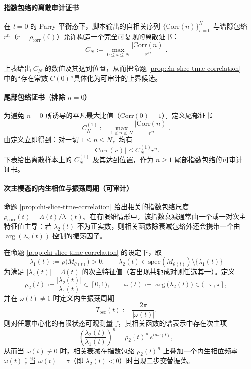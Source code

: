 \paragraph{指数包络的离散审计证书}
在 $t=0$ 的 Parry 平衡态下，脚本输出的自相关序列 $\{\mathrm{Corr}(n)\}_{n=0}^N$ 与谱隙包络 $r^n$（$r=\rho_{\mathrm{corr}}(0)$）允许构造一个完全可复现的离散证书：
\[
C_N:=\max_{0\le n\le N}\frac{|\mathrm{Corr}(n)|}{r^n}.
\]

上表给出 $C_N$ 的数值及其达到位置，从而把命题 \ref{prop:chi-slice-time-correlation} 中的“存在常数 $C(0)$”具体化为可审计的上界候选。

\paragraph{尾部包络证书（排除 $n=0$）}
为避免 $n=0$ 所诱导的平凡最大比值（$\mathrm{Corr}(0)=1$），定义尾部证书
\[
C_N^{(1)}:=\max_{1\le n\le N}\frac{|\mathrm{Corr}(n)|}{r^n}.
\]
由定义立即得到：对一切 $1\le n\le N$，均有
\[
|\mathrm{Corr}(n)|\le C_N^{(1)} r^n.
\]
下表给出离散样本上的 $C_N^{(1)}$ 及其达到位置，作为 $n\ge 1$ 尾部指数包络的可审计证书。


\paragraph{次主模态的内生相位与振荡周期（可审计）}
命题 \ref{prop:chi-slice-time-correlation} 给出相关的指数包络尺度 $\rho_{\mathrm{corr}}(t)=\Lambda(t)/\lambda_1(t)$。在有限维情形中，该指数衰减通常由一个或一对次主特征值主导：若 $\lambda_2(t)$ 不为正实数，则相关函数除衰减包络外还会携带一个由 $\arg(\lambda_2(t))$ 控制的振荡因子。

\begin{remark}[次主相位与内生振荡周期]
\label{prop:chi-slice-subleading-phase}
在命题 \ref{prop:chi-slice-time-correlation} 的设定下，取
\[
\lambda_1(t):=\rho\bigl(M_{\theta(t)}\bigr)>0,
\qquad
\lambda_2(t)\in\mathrm{spec}(M_{\theta(t)})\setminus\{\lambda_1(t)\}
\]
为满足 $|\lambda_2(t)|=\Lambda(t)$ 的次主特征值（若出现共轭成对则任选其一）。定义
\[
\rho_2(t):=\frac{|\lambda_2(t)|}{\lambda_1(t)}\in[0,1),
\qquad
\omega(t):=\arg\bigl(\lambda_2(t)\bigr)\in(-\pi,\pi],
\]
并在 $\omega(t)\ne 0$ 时定义内生振荡周期
\[
T_{\mathrm{osc}}(t):=\frac{2\pi}{|\omega(t)|}.
\]
则对任意中心化的有限状态可观测量 $f$，其相关函数的谱表示中存在次主项
\[
\left(\frac{\lambda_2(t)}{\lambda_1(t)}\right)^n
=\rho_2(t)^n\,e^{i n\omega(t)},
\]
从而当 $\omega(t)\ne 0$ 时，相关衰减在指数包络 $\rho_2(t)^n$ 上叠加一个内生相位频率 $\omega(t)$；当 $\omega(t)=\pi$（即 $\lambda_2(t)<0$）时出现二步交替振荡。
\end{remark}

